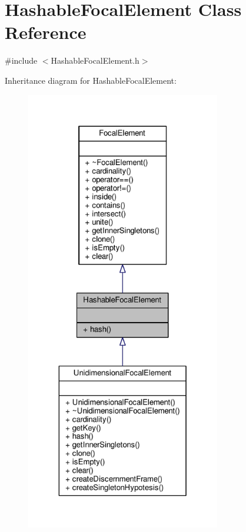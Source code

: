 \hypertarget{classHashableFocalElement}{}\section{Hashable\+Focal\+Element Class Reference}
\label{classHashableFocalElement}


{\ttfamily \#include $<$Hashable\+Focal\+Element.\+h$>$}



Inheritance diagram for Hashable\+Focal\+Element\+:\nopagebreak
\begin{figure}[H]
\begin{center}
\leavevmode
\includegraphics[height=550pt]{classHashableFocalElement__inherit__graph}
\end{center}
\end{figure}


